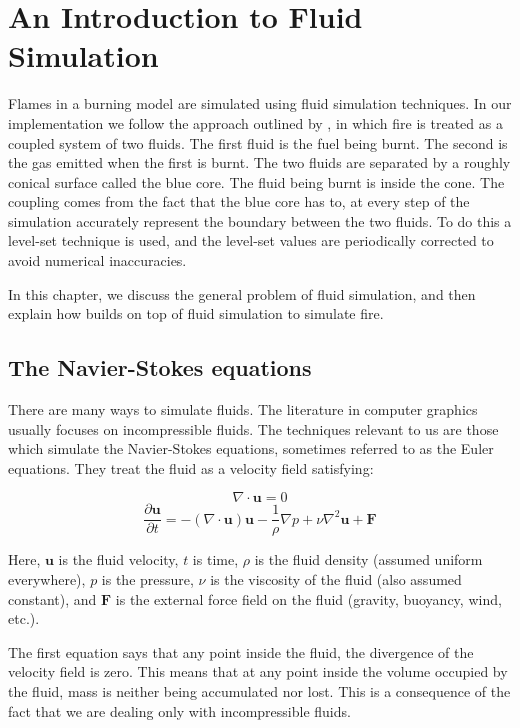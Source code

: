 \documentclass[a4paper]{report}
\begin{document}
\chapter{An Introduction to Fluid Simulation}

Flames in a burning model are simulated using fluid simulation techniques. In our implementation we follow the approach outlined by \cite{ngfeje}, in which fire is treated as a coupled system of two fluids. The first fluid is the fuel being burnt. The second is the gas emitted when the first is burnt. The two fluids are separated by a roughly conical surface called the blue core. The fluid being burnt is inside the cone. The coupling comes from the fact that the blue core has to, at every step of the simulation accurately represent the boundary between the two fluids. To do this a level-set technique is used, and the level-set values are periodically corrected to avoid numerical inaccuracies.

In this chapter, we discuss the general problem of fluid simulation, and then explain how \cite{ngfeje} builds on top of fluid simulation to simulate fire.

\section{The Navier-Stokes equations}

There are many ways to simulate fluids. The literature in computer graphics usually focuses on incompressible fluids. The techniques relevant to us are those which simulate the Navier-Stokes equations, sometimes referred to as the Euler equations. They treat the fluid as a velocity field satisfying:

\begin{equation}
\nabla \cdot \mathbf{u} = 0
\end{equation}
\begin{equation}
\dfrac{\partial{\mathbf{u}}}{\partial{t}} = -(\nabla \cdot \mathbf{u})\mathbf{u} - \dfrac{1}{\rho}\nabla p + \nu \nabla^2\mathbf{u} + \mathbf{F}
\end{equation}

Here, $\mathbf{u}$ is the fluid velocity, $t$ is time, $\rho$ is the fluid density (assumed uniform everywhere), $p$ is the pressure, $\nu$ is the viscosity of the fluid (also assumed constant), and $\mathbf{F}$ is the external force field on the fluid (gravity, buoyancy, wind, etc.).

The first equation says that any point inside the fluid, the divergence of the velocity field is zero. This means that at any point inside the volume occupied by the fluid, mass is neither being accumulated nor lost. This is a consequence of the fact that we are dealing only with incompressible fluids.
\end{document}
